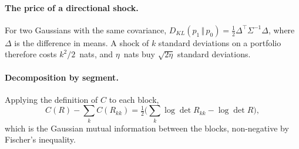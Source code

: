 \documentclass[11pt]{article}
\theoremstyle{definition}
\newcommand{\KL}[2]{D_{KL}\!\left(#1\,\Vert\,#2\right)}
\begin{document}
\paragraph{The price of a directional shock.} For two Gaussians with the same
covariance, $\KL{p_1}{p_0}=\tfrac12\Delta^\top\Sigma^{-1}\Delta$, where
$\Delta$ is the difference in means. A shock of $k$ standard deviations on a
portfolio therefore costs $k^2/2$~nats, and $\eta$~nats buy $\sqrt{2\eta}$
standard deviations.

\paragraph{Decomposition by segment.} Applying the definition of $C$ to each
block,
\[C(R)-\textstyle\sum_kC(R_{kk})=\tfrac12\bigl(\sum_k\log\det R_{kk}-\log\det R\bigr),\]
which is the Gaussian mutual information between the blocks, non-negative by
Fischer's inequality.
\end{document}
